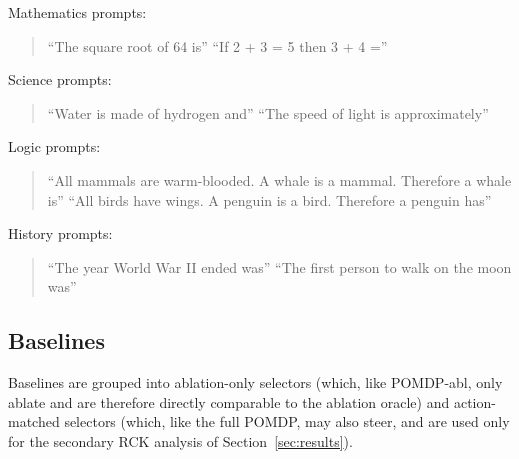 Mathematics prompts:
\begin{quote}
``The square root of 64 is''
``If 2 + 3 = 5 then 3 + 4 =''
\end{quote}

Science prompts:
\begin{quote}
``Water is made of hydrogen and''
``The speed of light is approximately''
\end{quote}

Logic prompts:
\begin{quote}
``All mammals are warm-blooded. A whale is a mammal. Therefore a whale is''
``All birds have wings. A penguin is a bird. Therefore a penguin has''
\end{quote}

History prompts:
\begin{quote}
``The year World War II ended was''
``The first person to walk on the moon was''
\end{quote}

\subsection{Baselines}

Baselines are grouped into ablation-only selectors (which, like POMDP-abl,
only ablate and are therefore directly comparable to the ablation oracle) and
action-matched selectors (which, like the full POMDP, may also steer, and
are used only for the secondary RCK analysis of Section~\ref{sec:results}).

